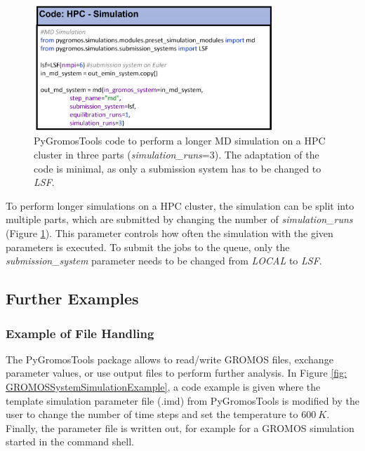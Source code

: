 \begin{figure}[h!]
    \centering
    \includegraphics[width=0.8\textwidth]{fig/ApplicationExamples/codeExample_GROMOSSystemHPCSimulation.png}
    \caption{PyGromosTools code to perform a longer MD simulation on a HPC cluster in three parts (\textit{simulation\_runs}=3). The adaptation of the code is minimal, as only a submission system has to be changed to \textit{LSF}.}
    \label{fig: GROMOSSystemSimulationHPCExample}
\end{figure}

To perform longer simulations on a HPC cluster, the simulation can be split into multiple parts, which are submitted by changing the number of \textit{simulation\_runs} (Figure \ref{fig: GROMOSSystemSimulationHPCExample}). This parameter controls how often the simulation with the given parameters is executed. To submit the jobs to the queue, only the \textit{submission\_system} parameter needs to be changed from \textit{LOCAL} to \textit{LSF}.



\FloatBarrier

\subsection{Further Examples}
\subsubsection{Example of File Handling}
The PyGromosTools package allows to read/write GROMOS files, exchange parameter values, or use output files to perform further analysis. In Figure \ref{fig: GROMOSSystemSimulationExample}, a code example is given where the template simulation parameter file (.imd) from PyGromosTools is modified by the user to change the number of time steps and set the temperature to $600~K$. Finally, the parameter file is written out, for example for a GROMOS simulation started in the command shell. 

